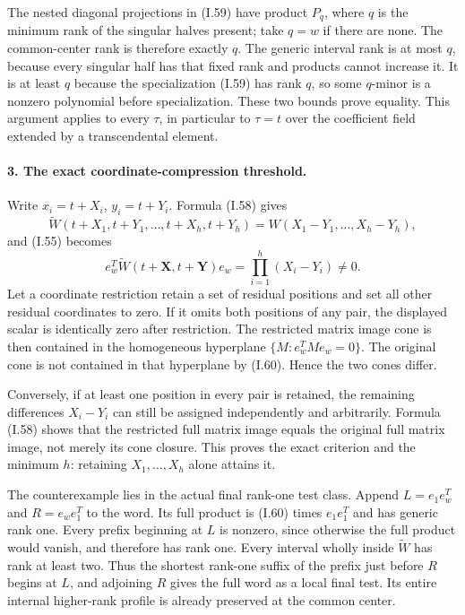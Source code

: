 \documentclass[11pt,a4paper]{article}
\theoremstyle{definition}\newtheorem{definition}{Definition}
\begin{document}
The nested diagonal projections in (I.59) have product
$P_q$, where $q$ is the minimum rank of the singular halves
present; take $q=w$ if there are none. The common-center rank
is therefore exactly $q$. The generic interval rank is at
most $q$, because every singular half has that fixed rank
and products cannot increase it. It is at least $q$ because
the specialization (I.59) has rank $q$, so some $q$-minor is
a nonzero polynomial before specialization. These two bounds
prove equality. This argument applies to every $\tau$, in
particular to $\tau=t$ over the coefficient field extended
by a transcendental element.

\paragraph{3. The exact coordinate-compression threshold.}
Write $x_i=t+X_i$, $y_i=t+Y_i$. Formula (I.58) gives
\[
 \widetilde W(t+X_1,t+Y_1,\ldots,t+X_h,t+Y_h)
     =W(X_1-Y_1,\ldots,X_h-Y_h),
\]
and (I.55) becomes
\[
 e_w^T\widetilde W(t+\mathbf X,t+\mathbf Y)e_w
       =\prod_{i=1}^h(X_i-Y_i)\ne0.
 \tag{I.60}
\]
Let a coordinate restriction retain a set of residual positions
and set all other residual coordinates to zero. If it omits
both positions of any pair, the displayed scalar is identically
zero after restriction. The restricted matrix image cone is
then contained in the homogeneous hyperplane
$\{M:e_w^TMe_w=0\}$. The original cone is not contained in
that hyperplane by (I.60). Hence the two cones differ.

Conversely, if at least one position in every pair is retained,
the remaining differences $X_i-Y_i$ can still be assigned
independently and arbitrarily. Formula (I.58) shows that the
restricted full matrix image equals the original full matrix
image, not merely its cone closure. This proves the exact
criterion and the minimum $h$: retaining $X_1,\ldots,X_h$
alone attains it.

The counterexample lies in the actual final rank-one test
class. Append $L=e_1e_w^T$ and $R=e_we_1^T$ to the word.
Its full product is (I.60) times $e_1e_1^T$ and has generic
rank one. Every prefix beginning at $L$ is nonzero, since
otherwise the full product would vanish, and therefore has
rank one. Every interval wholly inside $\widetilde W$ has
rank at least two. Thus the shortest rank-one suffix of the
prefix just before $R$ begins at $L$, and adjoining $R$
gives the full word as a local final test. Its entire internal
higher-rank profile is already preserved at the common center.
\end{document}
